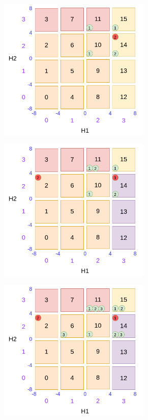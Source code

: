 \begin{figure}
\begin{subfigure}{0.45\textwidth}
		\includegraphics[width=0.8\textwidth]{figures/draw/e.png}
		\caption{}
		\label{fig:dsbo-example-e}
	\end{subfigure}
	\begin{subfigure}{0.45\textwidth}
		\includegraphics[width=0.8\textwidth]{figures/draw/f.png}
		\caption{}
		\label{fig:dsbo-example-f}
	\end{subfigure}
	\begin{subfigure}{0.45\textwidth}
		\includegraphics[width=0.8\textwidth]{figures/draw/g.png}

\end{subfigure}
\end{figure}
